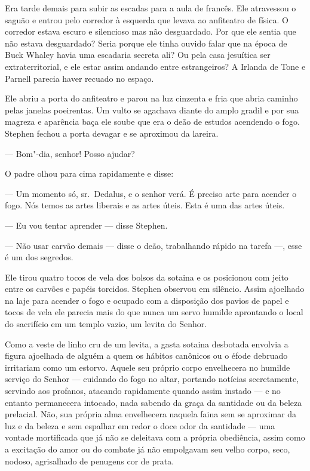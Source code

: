 Era tarde demais para subir as escadas para a aula de francês. Ele
atravessou o saguão e entrou pelo corredor à esquerda que levava ao
anfiteatro de física. O corredor estava escuro e silencioso mas não
desguardado. Por que ele sentia que não estava desguardado? Seria
porque ele tinha ouvido falar que na época de Buck Whaley havia uma
escadaria secreta ali? Ou pela casa jesuítica ser extraterritorial, e
ele estar assim andando entre estrangeiros? A Irlanda de Tone e Parnell
parecia haver recuado no espaço.

Ele abriu a porta do anfiteatro e parou na luz cinzenta e fria que abria
caminho pelas janelas poeirentas. Um vulto se agachava diante do amplo
gradil e por sua magreza e aparência baça ele soube que era o deão de
estudos acendendo o fogo. Stephen fechou a porta devagar e se aproximou
da lareira.

 --- Bom"-dia, senhor! Posso ajudar?

O padre olhou para cima rapidamente e disse:

 --- Um momento só, sr.~Dedalus, e o senhor verá. É preciso arte para
acender o fogo. Nós temos as artes liberais e as artes úteis. Esta é
uma das artes úteis.

 --- Eu vou tentar aprender --- disse Stephen.

 --- Não usar carvão demais --- disse o deão, trabalhando rápido na
tarefa ---, esse é um dos segredos.

Ele tirou quatro tocos de vela dos bolsos da sotaina e os posicionou com
jeito entre os carvões e papéis torcidos. Stephen observou em silêncio.
Assim ajoelhado na laje para acender o fogo e ocupado com a disposição
dos pavios de papel e tocos de vela ele parecia mais do que nunca um
servo humilde aprontando o local do sacrifício em um templo vazio, um
levita do Senhor.

Como a veste de linho cru de um levita, a gasta sotaina desbotada
envolvia a figura ajoelhada de alguém a quem os hábitos canônicos ou o
éfode debruado irritariam como um estorvo. Aquele seu próprio corpo
envelhecera no humilde serviço do Senhor --- cuidando do fogo no altar,
portando notícias secretamente, servindo aos profanos, atacando
rapidamente quando assim instado --- e no entanto permanecera intocado, nada
sabendo da graça da santidade ou da beleza prelacial. Não, sua própria
alma envelhecera naquela faina sem se aproximar da luz e da beleza e
sem espalhar em redor o doce odor da santidade --- uma vontade
mortificada que já não se deleitava com a própria obediência, assim
como a excitação do amor ou do combate já não empolgavam seu velho
corpo, seco, nodoso, agrisalhado de penugens cor de prata.

